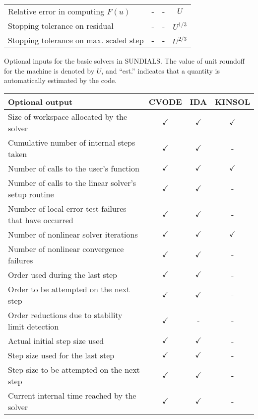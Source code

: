 \begin{acmtable}{340pt}
\begin{tabular}{p{2.75in} c c c }
Relative error in computing $F(u)$ & - & - & $U$ \\
Stopping tolerance on residual & - & - & $U^{1/3}$ \\
Stopping tolerance on max. scaled step & - & - & $U^{2/3}$ \\
\end{tabular}
\caption{Optional inputs for the basic solvers in SUNDIALS. 
The value of unit roundoff for the machine is denoted by $U$, 
and ``est.'' indicates that a quantity is automatically 
estimated by the code.}
\label{t:optional_input}
\end{acmtable}

\begin{acmtable}{327pt}
\centering
\begin{tabular}{p{2.75in} c c c }
Optional output & CVODE  & IDA & KINSOL \\
\hline
Size of workspace allocated by the solver & $\checkmark$ & $\checkmark$ & $\checkmark$ \\
Cumulative number of internal steps taken & $\checkmark$ & $\checkmark$ & - \\
Number of calls to the user's function & $\checkmark$ & $\checkmark$ & $\checkmark$ \\
Number of calls to the linear solver's setup routine & $\checkmark$ & $\checkmark$ & - \\
Number of local error test failures that have occurred & $\checkmark$ & $\checkmark$ & - \\
Number of nonlinear solver iterations & $\checkmark$ & $\checkmark$ & $\checkmark$ \\
Number of nonlinear convergence failures & $\checkmark$ & $\checkmark$ & - \\
Order used during the last step & $\checkmark$ & $\checkmark$ & - \\
Order to be attempted on the next step & $\checkmark$ & $\checkmark$ & - \\
Order reductions due to stability limit detection & $\checkmark$ & - & - \\
Actual initial step size used & $\checkmark$ & $\checkmark$ & - \\
Step size used for the last step & $\checkmark$ & $\checkmark$ & - \\
Step size to be attempted on the next step & $\checkmark$ & $\checkmark$ & - \\
Current internal time reached by the solver & $\checkmark$ & $\checkmark$ & - \\

\end{tabular}
\end{acmtable}
